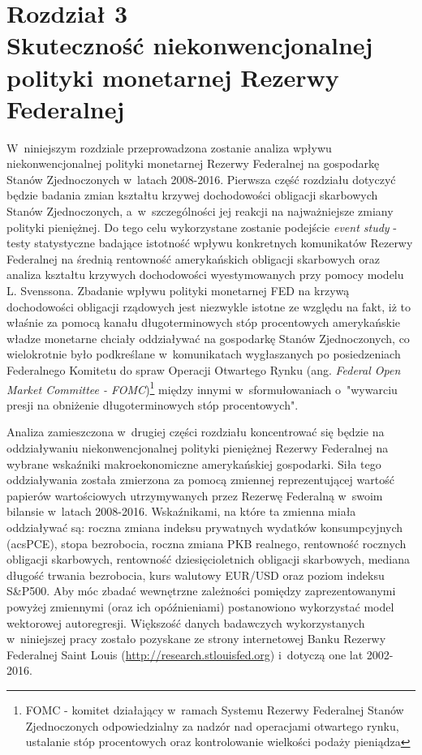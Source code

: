 \newpage
\hypertarget{roz3}{}
\chapter*{Rozdział 3 \\ \vspace{1cm} \Large{Skuteczność niekonwencjonalnej polityki monetarnej Rezerwy Federalnej}}
 
W~niniejszym rozdziale przeprowadzona zostanie analiza wpływu niekonwencjonalnej polityki monetarnej Rezerwy Federalnej na gospodarkę Stanów Zjednoczonych w~latach 2008-2016. Pierwsza część rozdziału dotyczyć będzie badania zmian kształtu krzywej dochodowości obligacji skarbowych Stanów Zjednoczonych, a~w~szczególności jej reakcji na najważniejsze zmiany polityki pieniężnej. Do tego celu wykorzystane zostanie podejście \textit{event study} - testy statystyczne badające istotność wpływu konkretnych komunikatów Rezerwy Federalnej na średnią rentowność amerykańskich obligacji skarbowych oraz analiza kształtu krzywych dochodowości wyestymowanych przy pomocy modelu L. Svenssona. Zbadanie wpływu polityki monetarnej FED na krzywą dochodowości obligacji rządowych jest niezwykle istotne ze względu na fakt, iż to właśnie za pomocą kanału długoterminowych stóp procentowych amerykańskie władze monetarne chciały oddziaływać na gospodarkę Stanów Zjednoczonych, co wielokrotnie było podkreślane w~komunikatach wygłaszanych po posiedzeniach Federalnego Komitetu do spraw Operacji Otwartego Rynku (ang. \textit{Federal Open Market Committee - FOMC})\footnote{\acs{FOMC} - komitet działający w~ramach Systemu Rezerwy Federalnej Stanów Zjednoczonych odpowiedzialny za nadzór nad operacjami otwartego rynku, ustalanie stóp procentowych oraz kontrolowanie wielkości podaży pieniądza} między innymi w~sformułowaniach o~"wywarciu presji na obniżenie długoterminowych stóp procentowych". 

Analiza zamieszczona w~drugiej części rozdziału koncentrować się będzie na oddziaływaniu niekonwencjonalnej polityki pieniężnej Rezerwy Federalnej na wybrane wskaźniki makroekonomiczne amerykańskiej gospodarki. Siła tego oddziaływania została zmierzona za pomocą zmiennej reprezentującej wartość papierów wartościowych utrzymywanych przez Rezerwę Federalną w~swoim bilansie w~latach 2008-2016. Wskaźnikami, na które ta zmienna miała oddziaływać są: roczna zmiana indeksu prywatnych wydatków konsumpcyjnych (acs{PCE}), stopa bezrobocia, roczna zmiana \acs{PKB} realnego, rentowność rocznych obligacji skarbowych, rentowność dziesięcioletnich obligacji skarbowych, mediana długość trwania bezrobocia, kurs walutowy EUR/USD oraz poziom indeksu S\&P500. Aby móc zbadać wewnętrzne zależności pomiędzy zaprezentowanymi powyżej zmiennymi (oraz ich opóźnieniami) postanowiono wykorzystać model wektorowej autoregresji. Większość danych badawczych wykorzystanych w~niniejszej pracy zostało pozyskane ze strony internetowej Banku Rezerwy Federalnej Saint Louis (\url{http://research.stlouisfed.org}) i~dotyczą one lat 2002-2016.

